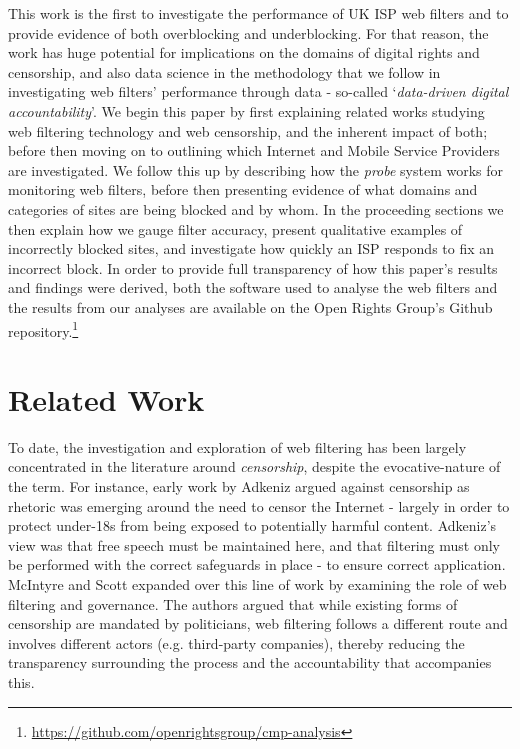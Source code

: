 \documentclass{bmcart}
\begin{document}
This work is the first to investigate the performance of UK ISP web filters and to provide evidence of both overblocking and underblocking.
For that reason, the work has huge potential for implications on the domains of digital rights and censorship, and also data science in the methodology that we follow in investigating web filters' performance through data - so-called `\textit{data-driven digital accountability}'. 
We begin this paper by first explaining related works studying web filtering technology and web censorship, and the inherent impact of both; before then moving on to outlining which Internet and Mobile Service Providers are investigated.
We follow this up by describing how the \textit{probe} system works for monitoring web filters, before then presenting evidence of what domains and categories of sites are being blocked and by whom.
In the proceeding sections we then explain how we gauge filter accuracy, present qualitative examples of incorrectly blocked sites, and investigate how quickly an ISP responds to fix an incorrect block.
In order to provide full transparency of how this paper's results and findings were derived, both the software used to analyse the web filters and the results from our analyses are available on the Open Rights Group's Github repository.\footnote{\url{https://github.com/openrightsgroup/cmp-analysis}}


\section*{Related Work}
To date, the investigation and exploration of web filtering has been largely concentrated in the literature around \textit{censorship}, despite the evocative-nature of the term.
For instance, early work by Adkeniz \cite{akdeniz2001internet} argued against censorship as rhetoric was emerging around the need to censor the Internet - largely in order to protect under-18s from being exposed to potentially harmful content.
Adkeniz's view was that free speech must be maintained here, and that filtering must only be performed with the correct safeguards in place - to ensure correct application.
McIntyre and Scott \cite{mcintyre2008internet} expanded over this line of work by examining the role of web filtering and governance.
The authors argued that while existing forms of censorship are mandated by politicians, web filtering follows a different route and involves different actors (e.g. third-party companies), thereby reducing the transparency surrounding the process and the accountability that accompanies this.
\end{document}
